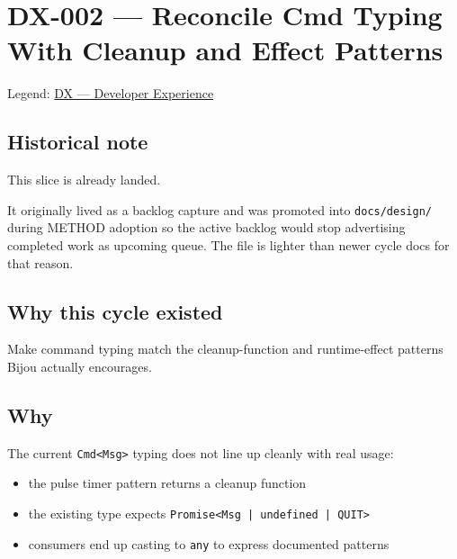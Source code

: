 \chapter{DX-002 --- Reconcile Cmd Typing With Cleanup and Effect Patterns}\label{record-121}

\smallskip

Legend: \href{https://github.com/flyingrobots/bijou/blob/1853ad902f6bf219326409e7f743a5a1d6517dbc/docs/legends/DX-developer-experience.md}{DX --- Developer Experience}

\section{Historical note}\label{record-121-historical-note}

This slice is already landed.

It originally lived as a backlog capture and was promoted into \texttt{d\allowbreak{}o\allowbreak{}c\allowbreak{}s\allowbreak{}/\allowbreak{}d\allowbreak{}e\allowbreak{}s\allowbreak{}i\allowbreak{}g\allowbreak{}n\allowbreak{}/} during METHOD adoption so the active backlog would stop advertising completed work as upcoming queue. The file is lighter than newer cycle docs for that reason.

\section{Why this cycle existed}\label{record-121-why-this-cycle-existed}

Make command typing match the cleanup-function and runtime-effect patterns Bijou actually encourages.

\section{Why}\label{record-121-why}

The current \texttt{C\allowbreak{}m\allowbreak{}d\allowbreak{}<\allowbreak{}M\allowbreak{}s\allowbreak{}g\allowbreak{}>} typing does not line up cleanly with real usage:

\begin{itemize}
\tightlist
\item
  the pulse timer pattern returns a cleanup function
\item
  the existing type expects \texttt{P\allowbreak{}r\allowbreak{}o\allowbreak{}m\allowbreak{}i\allowbreak{}s\allowbreak{}e\allowbreak{}<\allowbreak{}M\allowbreak{}s\allowbreak{}g\allowbreak{} \allowbreak{}|\allowbreak{} \allowbreak{}u\allowbreak{}n\allowbreak{}d\allowbreak{}e\allowbreak{}f\allowbreak{}i\allowbreak{}n\allowbreak{}e\allowbreak{}d\allowbreak{} \allowbreak{}|\allowbreak{} \allowbreak{}Q\allowbreak{}U\allowbreak{}I\allowbreak{}T\allowbreak{}>}
\item
  consumers end up casting to \texttt{a\allowbreak{}n\allowbreak{}y} to express documented patterns
\end{itemize}

